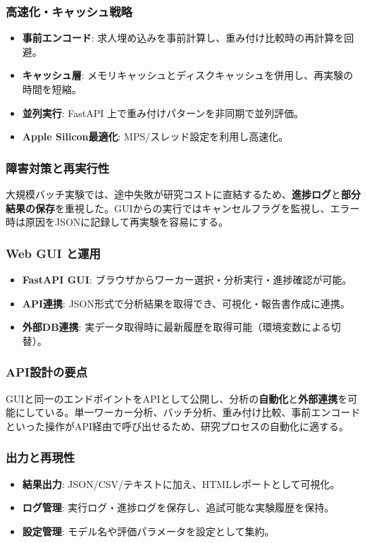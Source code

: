\subsubsection*{高速化・キャッシュ戦略}
\begin{itemize}
	\item \textbf{事前エンコード}: 求人埋め込みを事前計算し、重み付け比較時の再計算を回避。
	\item \textbf{キャッシュ層}: メモリキャッシュとディスクキャッシュを併用し、再実験の時間を短縮。
	\item \textbf{並列実行}: FastAPI 上で重み付けパターンを非同期で並列評価。
	\item \textbf{Apple Silicon最適化}: MPS/スレッド設定を利用し高速化。
\end{itemize}

\subsubsection*{障害対策と再実行性}
大規模バッチ実験では、途中失敗が研究コストに直結するため、\textbf{進捗ログ}と\textbf{部分結果の保存}を重視した。GUIからの実行ではキャンセルフラグを監視し、エラー時は原因をJSONに記録して再実験を容易にする。

\subsubsection*{Web GUI と運用}
\begin{itemize}
	\item \textbf{FastAPI GUI}: ブラウザからワーカー選択・分析実行・進捗確認が可能。
	\item \textbf{API連携}: JSON形式で分析結果を取得でき、可視化・報告書作成に連携。
	\item \textbf{外部DB連携}: 実データ取得時に最新履歴を取得可能（環境変数による切替）。
\end{itemize}

\subsubsection*{API設計の要点}
GUIと同一のエンドポイントをAPIとして公開し、分析の\textbf{自動化}と\textbf{外部連携}を可能にしている。単一ワーカー分析、バッチ分析、重み付け比較、事前エンコードといった操作がAPI経由で呼び出せるため、研究プロセスの自動化に適する。

\subsubsection*{出力と再現性}
\begin{itemize}
	\item \textbf{結果出力}: JSON/CSV/テキストに加え、HTMLレポートとして可視化。
	\item \textbf{ログ管理}: 実行ログ・進捗ログを保存し、追試可能な実験履歴を保持。
	\item \textbf{設定管理}: モデル名や評価パラメータを設定として集約。
\end{itemize}

